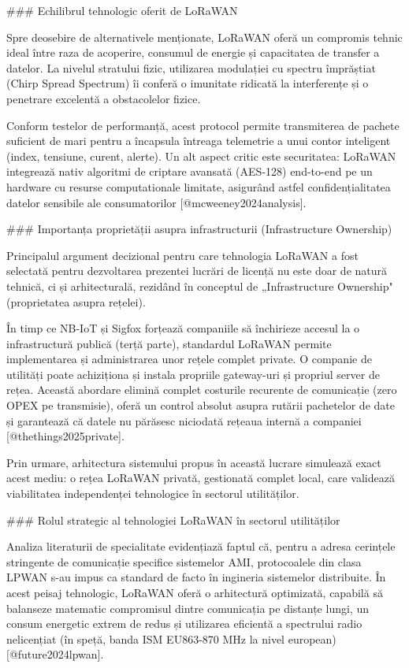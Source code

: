 ### Echilibrul tehnologic oferit de LoRaWAN

Spre deosebire de alternativele menționate, LoRaWAN oferă un compromis
tehnic ideal între raza de acoperire, consumul de energie și capacitatea
de transfer a datelor. La nivelul stratului fizic, utilizarea modulației
cu spectru împrăștiat (Chirp Spread Spectrum) îi conferă o imunitate
ridicată la interferențe și o penetrare excelentă a obstacolelor fizice.

Conform testelor de performanță, acest protocol permite transmiterea de
pachete suficient de mari pentru a încapsula întreaga telemetrie a unui
contor inteligent (index, tensiune, curent, alerte). Un alt aspect
critic este securitatea: LoRaWAN integrează nativ algoritmi de criptare
avansată (AES-128) end-to-end pe un hardware cu resurse computationale
limitate, asigurând astfel confidențialitatea datelor sensibile ale
consumatorilor [@mcweeney2024analysis].

### Importanța proprietății asupra infrastructurii (Infrastructure Ownership)

Principalul argument decizional pentru care tehnologia LoRaWAN a fost
selectată pentru dezvoltarea prezentei lucrări de licență nu este doar
de natură tehnică, ci și arhitecturală, rezidând în conceptul de
„Infrastructure Ownership" (proprietatea asupra rețelei).

În timp ce NB-IoT și Sigfox forțează companiile să închirieze accesul la
o infrastructură publică (terță parte), standardul LoRaWAN permite
implementarea și administrarea unor rețele complet private. O companie
de utilități poate achiziționa și instala propriile gateway-uri și
propriul server de rețea. Această abordare elimină complet costurile
recurente de comunicație (zero OPEX pe transmisie), oferă un control
absolut asupra rutării pachetelor de date și garantează că datele nu
părăsesc niciodată rețeaua internă a companiei [@thethings2025private].

Prin urmare, arhitectura sistemului propus în această lucrare simulează
exact acest mediu: o rețea LoRaWAN privată, gestionată complet local,
care validează viabilitatea independenței tehnologice în sectorul
utilităților.

### Rolul strategic al tehnologiei LoRaWAN în sectorul utilităților

Analiza literaturii de specialitate evidențiază faptul că, pentru a
adresa cerințele stringente de comunicație specifice sistemelor AMI,
protocoalele din clasa LPWAN s-au impus ca standard de facto în
ingineria sistemelor distribuite. În acest peisaj tehnologic, LoRaWAN
oferă o arhitectură optimizată, capabilă să balanseze matematic
compromisul dintre comunicația pe distanțe lungi, un consum energetic
extrem de redus și utilizarea eficientă a spectrului radio nelicențiat
(în speță, banda ISM EU863-870 MHz la nivel european)
[@future2024lpwan].

